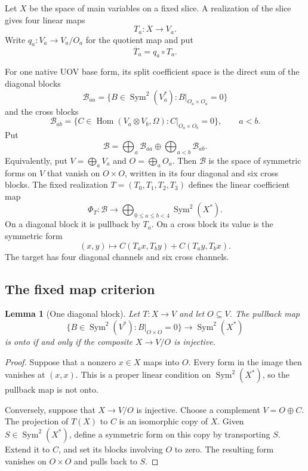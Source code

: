 \documentclass[11pt]{article}
\newcommand{\Sym}{\operatorname{Sym}}
\newcommand{\Hom}{\operatorname{Hom}}
\theoremstyle{plain}
\newtheorem{lemma}[theorem]{Lemma}
\theoremstyle{definition}
\theoremstyle{remark}
\begin{document}
Let $X$ be the space of main variables on a fixed slice.  A realization of
the slice gives four linear maps
\[
  T_a:X\longrightarrow V_a.
\]
Write $q_a:V_a\to V_a/O_a$ for the quotient map and put
\[
  \overline T_a=q_a\circ T_a.
\]

For one native UOV base form, its split coefficient space is the direct sum
of the diagonal blocks
\[
 \mathcal B_{aa}
 =\{B\in\Sym^2(V_a^*):B|_{O_a\times O_a}=0\}
\]
and the cross blocks
\[
 \mathcal B_{ab}
 =\{C\in\Hom(V_a\otimes V_b,\Omega):
       C|_{O_a\times O_b}=0\},
 \qquad a<b.
\]
Put
\[
 \mathcal B
 =\bigoplus_a\mathcal B_{aa}
  \oplus\bigoplus_{a<b}\mathcal B_{ab}.
\]
Equivalently, put $V=\bigoplus_aV_a$ and $O=\bigoplus_aO_a$.  Then
$\mathcal B$ is the space of symmetric forms on $V$ that vanish on
$O\times O$, written in its four diagonal and six cross blocks.
The fixed realization $T=(T_0,T_1,T_2,T_3)$ defines the linear coefficient
map
\[
 \Phi_T:\mathcal B
 \longrightarrow
 \bigoplus_{0\leq a\leq b<4}\Sym^2(X^*).
 \label{eq:l4-fixed-map}
\]
On a diagonal block it is pullback by $T_a$.  On a cross block its value is
the symmetric form
\[
 (x,y)\longmapsto
 C(T_a x,T_b y)+C(T_a y,T_b x).
 \label{eq:l4-cross-map}
\]
The target has four diagonal channels and six cross channels.

\subsection{The fixed map criterion}

\begin{lemma}[One diagonal block]
\label{lem:l4-fixed-diagonal}
Let $T:X\to V$ and let $O\subseteq V$.  The pullback map
\[
 \{B\in\Sym^2(V^*):B|_{O\times O}=0\}
 \longrightarrow\Sym^2(X^*)
\]
is onto if and only if the composite $X\to V/O$ is injective.
\end{lemma}

\begin{proof}
Suppose that a nonzero $x\in X$ maps into $O$.  Every form in the image then
vanishes at $(x,x)$.  This is a proper linear condition on
$\Sym^2(X^*)$, so the pullback map is not onto.

Conversely, suppose that $X\to V/O$ is injective.  Choose a complement
$V=O\oplus C$.  The projection of $T(X)$ to $C$ is an isomorphic copy of
$X$.  Given $S\in\Sym^2(X^*)$, define a symmetric form on this copy by
transporting $S$.  Extend it to $C$, and set its blocks involving $O$ to
zero.  The resulting form vanishes on $O\times O$ and pulls back to $S$.
\end{proof}
\end{document}
